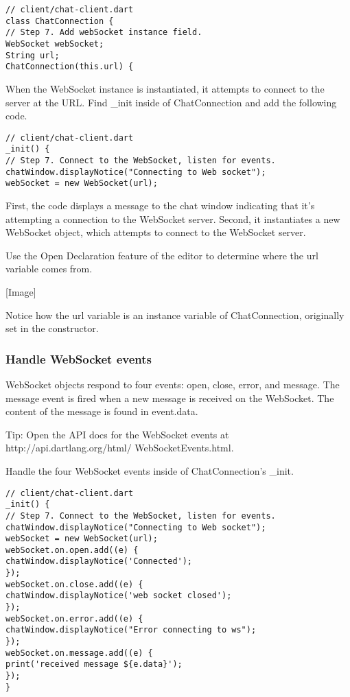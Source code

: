 \begin{verbatim}
// client/chat-client.dart
class ChatConnection {
// Step 7. Add webSocket instance field.
WebSocket webSocket;
String url;
ChatConnection(this.url) {
\end{verbatim}

When the WebSocket instance is instantiated, it attempts to connect to the server at the URL. Find \_init inside of ChatConnection and add the following code.

\begin{verbatim}
// client/chat-client.dart
_init() {
// Step 7. Connect to the WebSocket, listen for events.
chatWindow.displayNotice("Connecting to Web socket");
webSocket = new WebSocket(url);
\end{verbatim}

First, the code displays a message to the chat window indicating that it's attempting a connection to the WebSocket server. Second, it instantiates a new WebSocket object, which attempts to connect to the WebSocket server.

Use the Open Declaration feature of the editor to determine where the url variable comes from.

[Image]

Notice how the url variable is an instance variable of ChatConnection, originally set in the constructor.

\subsubsection{Handle WebSocket events}

WebSocket objects respond to four events: open, close, error, and message. The message event is fired when a new message is received on the WebSocket. The content of the message is found in event.data.

Tip: Open the API docs for the WebSocket events at http://api.dartlang.org/html/
WebSocketEvents.html.

Handle the four WebSocket events inside of ChatConnection's \_init.

\begin{verbatim}
// client/chat-client.dart
_init() {
// Step 7. Connect to the WebSocket, listen for events.
chatWindow.displayNotice("Connecting to Web socket");
webSocket = new WebSocket(url);
webSocket.on.open.add((e) {
chatWindow.displayNotice('Connected');
});
webSocket.on.close.add((e) {
chatWindow.displayNotice('web socket closed');
});
webSocket.on.error.add((e) {
chatWindow.displayNotice("Error connecting to ws");
});
webSocket.on.message.add((e) {
print('received message ${e.data}');
});
}
\end{verbatim}

